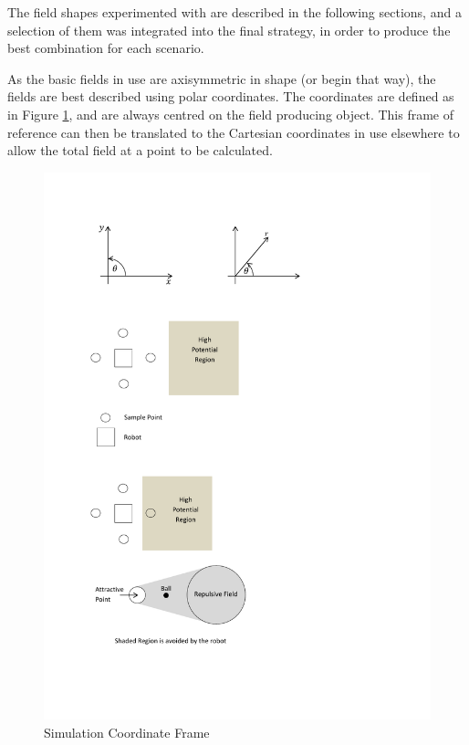\documentclass[10pt]{article}
\begin{document}
The field shapes experimented with are described in the following sections, and
a selection of them was integrated into the final strategy, in order to produce
the best combination for each scenario.

As the basic fields in use are axisymmetric in shape (or begin that way), the
fields are best described using polar coordinates. The coordinates are defined
as in Figure \ref{fig:polarCoordinateFrame}, and are always centred on the field
producing object. This frame of reference can then be translated to the
Cartesian coordinates in use elsewhere to allow the total field at a point to be
calculated.

\begin{figure}
 \centering
 \includegraphics[trim=9cm 23.5cm 7cm 2cm, clip=true]{Images/illustrations}
 \caption{Simulation Coordinate Frame}
 \label{fig:polarCoordinateFrame}
\end{figure}
\end{document}
